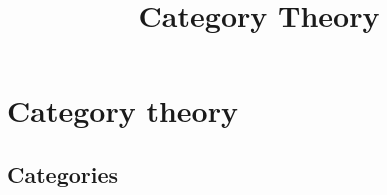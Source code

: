 

\title{Category Theory}


\maketitle
\tableofcontents
\listoftodos

\part{Category theory}

\chapter{Categories}







